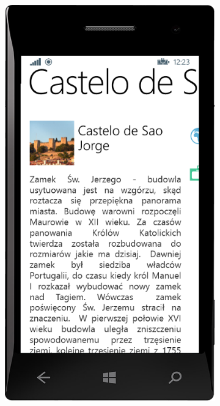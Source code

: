 \documentclass[a4paper]{book}
\begin{document}
\begin{figure}[H]
\begin{subfigure}{0.3\textwidth}
				\includegraphics[width=\textwidth]{screenshots/mobile/mobile11.png}	
				\caption{\label{subfig:mobile_place}}	
			\end{subfigure}
			\hfill
			\begin{subfigure}{0.3\textwidth}

\end{subfigure}
\end{figure}
\end{document}
